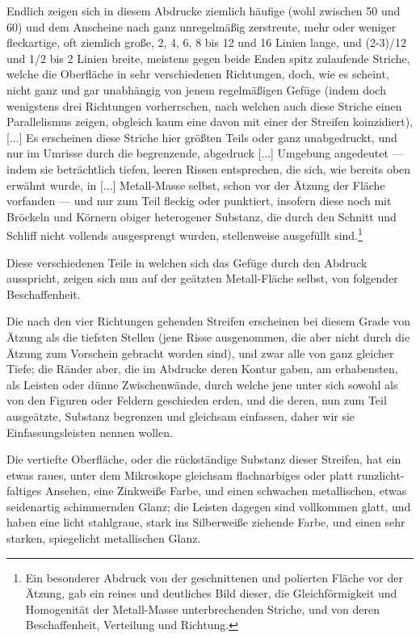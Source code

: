 \documentclass[a4paper, 11pt, oneside, german]{article}
\begin{document}
Endlich zeigen sich in diesem Abdrucke ziemlich häufige (wohl zwischen 50 und 60) und dem Anscheine nach ganz unregelmäßig zerstreute, mehr oder weniger fleckartige, oft ziemlich große, 2, 4, 6, 8 bis 12 und 16 Linien lange, und (2-3)/12 und 1/2 bis 2 Linien breite, meistens gegen beide Enden spitz zulaufende Striche, welche die Oberfläche in sehr verschiedenen Richtungen, doch, wie es scheint, nicht ganz und gar unabhängig von jenem regelmäßigen Gefüge (indem doch wenigstens drei Richtungen vorherrschen, nach welchen auch diese Striche einen Parallelismus zeigen, obgleich kaum eine davon mit einer der Streifen koinzidiert), [...] Es erscheinen diese Striche hier größten Teils oder ganz unabgedruckt, und nur im Umrisse durch die begrenzende, abgedruck [...] Umgebung angedeutet --- indem sie beträchtlich tiefen, leeren Rissen entsprechen, die sich, wie bereits oben erwähnt wurde, in [...] Metall-Masse selbst, schon vor der Ätzung der Fläche vorfanden --- und nur zum Teil fleckig oder punktiert, insofern diese noch mit Bröckeln und Körnern obiger heterogener Substanz, die durch den Schnitt und Schliff nicht vollends ausgesprengt wurden, stellenweise ausgefüllt sind.\footnote{Ein besonderer Abdruck von der geschnittenen und polierten Fläche vor der Ätzung, gab ein reines und deutliches Bild dieser, die Gleichförmigkeit und Homogenität der Metall-Masse unterbrechenden Striche, und von deren Beschaffenheit, Verteilung und Richtung.}

Diese verschiedenen Teile in welchen sich das Gefüge durch den Abdruck ausspricht, zeigen sich nun auf der geätzten Metall-Fläche selbst, von folgender Beschaffenheit.

Die nach den vier Richtungen gehenden Streifen erscheinen bei diesem Grade von Ätzung als die tiefsten Stellen (jene Risse ausgenommen, die aber nicht durch die Ätzung zum Vorschein gebracht worden sind), und zwar alle von ganz gleicher Tiefe; die Ränder aber, die im Abdrucke deren Kontur gaben, am erhabensten, als Leisten oder dünne Zwischenwände, durch welche jene unter sich sowohl als von den Figuren oder Feldern geschieden erden, und die deren, nun zum Teil ausgeätzte, Substanz begrenzen und gleichsam einfassen, daher wir sie Einfassungsleisten nennen wollen.

Die vertiefte Oberfläche, oder die rückständige Substanz dieser Streifen, hat ein etwas raues, unter dem Mikroskope gleichsam flachnarbiges oder platt runzlicht-faltiges Ansehen, eine Zinkweiße Farbe, und einen schwachen metallischen, etwas seidenartig schimmernden Glanz; die Leisten dagegen sind vollkommen glatt, und haben eine licht stahlgraue, stark ins Silberweiße ziehende Farbe, und einen sehr starken, spiegelicht metallischen Glanz.
\end{document}
